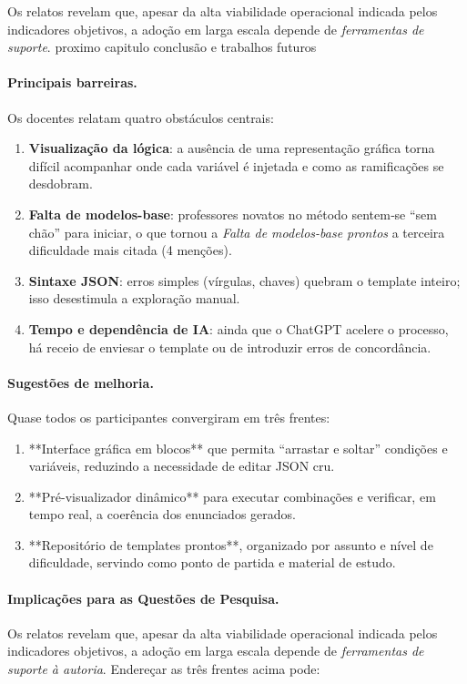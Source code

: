 

Os relatos revelam que, apesar da alta viabilidade operacional indicada pelos indicadores objetivos, a adoção em larga escala depende de \emph{ferramentas de suporte}.   proximo capitulo conclusão e trabalhos futuros

\paragraph{Principais barreiras.}
Os docentes relatam quatro obstáculos centrais:

\begin{enumerate}[label=(\alph*)]
    \item \textbf{Visualização da lógica}: a ausência de uma representação gráfica torna difícil acompanhar onde cada variável é injetada e como as ramificações se desdobram.
    \item \textbf{Falta de modelos-base}: professores novatos no método sentem‐se “sem chão” para iniciar, o que tornou a \emph{Falta de modelos-base prontos} a terceira dificuldade mais citada (4 menções).
    \item \textbf{Sintaxe JSON}: erros simples (vírgulas, chaves) quebram o template inteiro; isso desestimula a exploração manual.
    \item \textbf{Tempo e dependência de IA}: ainda que o ChatGPT acelere o processo, há receio de enviesar o template ou de introduzir erros de concordância.
\end{enumerate}

\paragraph{Sugestões de melhoria.}
Quase todos os participantes convergiram em três frentes:

\begin{enumerate}[label=(\roman*)]
    \item **Interface gráfica em blocos** que permita “arrastar e soltar” condições e variáveis, reduzindo a necessidade de editar JSON cru.
    \item **Pré-visualizador dinâmico** para executar combinações e verificar, em tempo real, a coerência dos enunciados gerados.
    \item **Repositório de templates prontos**, organizado por assunto e nível de dificuldade, servindo como ponto de partida e material de estudo.
\end{enumerate}

\paragraph{Implicações para as Questões de Pesquisa.}
Os relatos revelam que, apesar da alta viabilidade operacional indicada pelos indicadores objetivos, a adoção em larga escala depende de \emph{ferramentas de suporte à autoria}.  Endereçar as três frentes acima pode:


